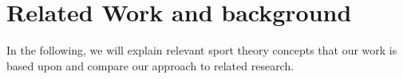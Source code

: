 \section{Related Work and background} \label{sec:rel_work}
In the following, we will explain relevant sport theory concepts that our work is based upon and compare our approach to related research.
